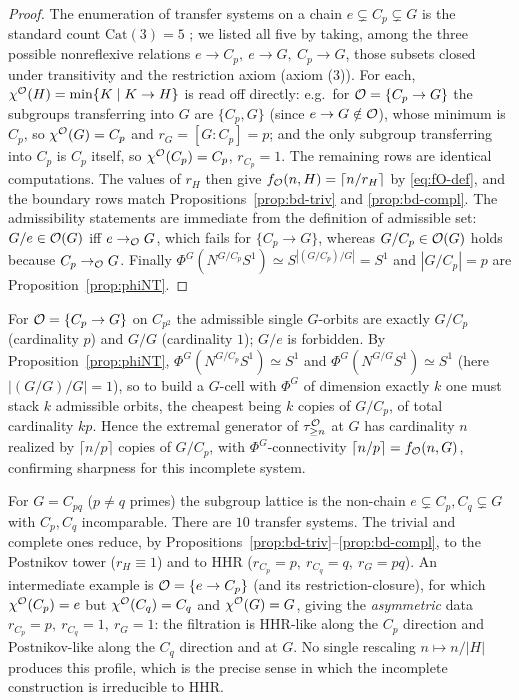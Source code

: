 \begin{proof}
The enumeration of transfer systems on a chain $e\subsetneq C_p\subsetneq G$ is
the standard count $\mathrm{Cat}(3)=5$ \cite{Rubin,BBR}; we listed all five by
taking, among the three possible nonreflexive relations
$e\to C_p,\ e\to G,\ C_p\to G$, those subsets closed under transitivity and the
restriction axiom (axiom (3)). For each, $\chi^{\mathcal{O}}(H)=\min\{K\mid K\to H\}$ is
read off directly: e.g.\ for $\mathcal{O}=\{C_p\to G\}$ the subgroups transferring
into $G$ are $\{C_p,G\}$ (since $e\to G\notin\mathcal{O}$), whose minimum is $C_p$, so
$\chi^{\mathcal{O}}(G)=C_p$ and $r_G=[G:C_p]=p$; and the only subgroup transferring into
$C_p$ is $C_p$ itself, so $\chi^{\mathcal{O}}(C_p)=C_p$, $r_{C_p}=1$. The remaining rows
are identical computations. The values of $r_H$ then give
$f_{\mathcal{O}}(n,H)=\lceil n/r_H\rceil$ by \eqref{eq:fO-def}, and the boundary rows
match Propositions~\ref{prop:bd-triv} and \ref{prop:bd-compl}. The
admissibility statements are immediate from the definition of admissible set:
$G/e\in\mathcal{O}(G)$ iff $e\to_{\mathcal{O}} G$, which fails for $\{C_p\to G\}$, whereas
$G/C_p\in\mathcal{O}(G)$ holds because $C_p\to_{\mathcal{O}} G$. Finally
$\Phi^G(N^{G/C_p}S^1)\simeq S^{|(G/C_p)/G|}=S^{1}$ and $|G/C_p|=p$ are
Proposition~\ref{prop:phiNT}.
\end{proof}

\begin{qfiveremark}
For $\mathcal{O}=\{C_p\to G\}$ on $C_{p^2}$ the admissible single $G$-orbits are exactly
$G/C_p$ (cardinality $p$) and $G/G$ (cardinality $1$); $G/e$ is forbidden. By
Proposition~\ref{prop:phiNT}, $\Phi^G(N^{G/C_p}S^1)\simeq S^1$ and
$\Phi^G(N^{G/G}S^1)\simeq S^1$ (here $|(G/G)/G|=1$), so to build a $G$-cell with
$\Phi^G$ of dimension exactly $k$ one must stack $k$ admissible orbits, the
cheapest being $k$ copies of $G/C_p$, of total cardinality $kp$. Hence the
extremal generator of $\tau^{\mathcal{O}}_{\ge n}$ at $G$ has cardinality $n$ realized by
$\lceil n/p\rceil$ copies of $G/C_p$, with $\Phi^G$-connectivity $\lceil
n/p\rceil=f_{\mathcal{O}}(n,G)$, confirming sharpness for this incomplete system.
\end{qfiveremark}

\begin{qfiveremark}
For $G=C_{pq}$ ($p\ne q$ primes) the subgroup lattice is the
non-chain $e\subsetneq C_p,C_q\subsetneq G$ with $C_p,C_q$ incomparable. There
are $10$ transfer systems. The trivial and complete ones reduce, by
Propositions~\ref{prop:bd-triv}--\ref{prop:bd-compl}, to the Postnikov tower
($r_H\equiv1$) and to HHR ($r_{C_p}=p,\ r_{C_q}=q,\ r_G=pq$). An intermediate
example is $\mathcal{O}=\{e\to C_p\}$ (and its restriction-closure), for which
$\chi^{\mathcal{O}}(C_p)=e$ but $\chi^{\mathcal{O}}(C_q)=C_q$ and $\chi^{\mathcal{O}}(G)=G$, giving the
\emph{asymmetric} data $r_{C_p}=p,\ r_{C_q}=1,\ r_G=1$: the filtration is
HHR-like along the $C_p$ direction and Postnikov-like along the $C_q$ direction
and at $G$. No single rescaling $n\mapsto n/|H|$ produces this profile, which is
the precise sense in which the incomplete construction is irreducible to HHR.
\end{qfiveremark}

